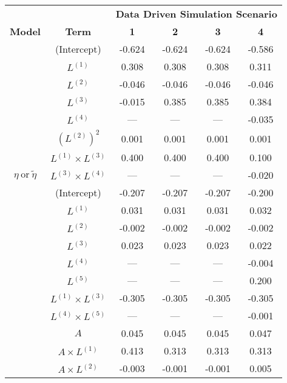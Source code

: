 \begin{table}
\begin{minipage}[t]{0.5\textwidth}
\centering

\begin{tabular}[t]{|>{}c|c|c|c|c|>{}c|}
\hline
\multicolumn{1}{|c|}{\textbf{ }} & \multicolumn{1}{|c|}{\textbf{ }} & \multicolumn{4}{|c|}{\textbf{Data Driven Simulation Scenario}} \\
\cline{3-6}
\textbf{Model} & \textbf{Term} & \textbf{1} & \textbf{2} & \textbf{3} & \textbf{4}\\
\hline
 & (Intercept) & -0.624 & -0.624 & -0.624 & -0.586\\
\cline{2-6}
 & $L^{(1)}$ & 0.308 & 0.308 & 0.308 & 0.311\\
\cline{2-6}
 & $L^{(2)}$ & -0.046 & -0.046 & -0.046 & -0.046\\
\cline{2-6}
 & $L^{(3)}$ & -0.015 & 0.385 & 0.385 & 0.384\\
\cline{2-6}
 & $L^{(4)}$ & --- & --- & --- & -0.035\\
\cline{2-6}
 & $(L^{(2)})^2$ & 0.001 & 0.001 & 0.001 & 0.001\\
\cline{2-6}
 & $L^{(1)} \times L^{(3)}$ & 0.400 & 0.400 & 0.400 & 0.100\\
\cline{2-6}
\multirow{-8}{*}{\centering\arraybackslash $\eta~\text{or}~\tilde\eta$} & $L^{(3)} \times L^{(4)}$ & --- & --- & --- & -0.020\\
\cline{1-6}
 & (Intercept) & -0.207 & -0.207 & -0.207 & -0.200\\
\cline{2-6}
 & $L^{(1)}$ & 0.031 & 0.031 & 0.031 & 0.032\\
\cline{2-6}
 & $L^{(2)}$ & -0.002 & -0.002 & -0.002 & -0.002\\
\cline{2-6}
 & $L^{(3)}$ & 0.023 & 0.023 & 0.023 & 0.022\\
\cline{2-6}
 & $L^{(4)}$ & --- & --- & --- & -0.004\\
\cline{2-6}
 & $L^{(5)}$ & --- & --- & --- & 0.200\\
\cline{2-6}
 & $L^{(1)} \times L^{(3)}$ & -0.305 & -0.305 & -0.305 & -0.305\\
\cline{2-6}
 & $L^{(4)} \times L^{(5)}$ & --- & --- & --- & -0.001\\
\cline{2-6}
 & $A$ & 0.045 & 0.045 & 0.045 & 0.047\\
\cline{2-6}
 & $A \times L^{(1)}$ & 0.413 & 0.313 & 0.313 & 0.313\\
\cline{2-6}
 & $A \times L^{(2)}$ & -0.003 & -0.001 & -0.001 & 0.005\\

\end{tabular}
\end{minipage}
\end{table}
